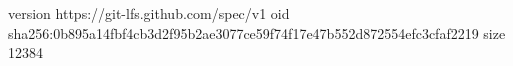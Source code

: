 version https://git-lfs.github.com/spec/v1
oid sha256:0b895a14fbf4cb3d2f95b2ae3077ce59f74f17e47b552d872554efc3cfaf2219
size 12384
